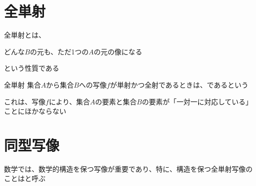 \documentclass[../../../topic_mapping]{subfiles}
\begin{document}
\sectionline
\section{全単射}

全単射とは、
\begin{shaded}
  どんな$B$の元も、ただ1つの$A$の元の像になる
\end{shaded}
という性質である

\begin{definition}{全単射}
  集合$A$から集合$B$への写像$f$が単射かつ全射であるときは、であるという
\end{definition}

これは、写像$f$により、集合$A$の要素と集合$B$の要素が「一対一に対応している」ことにほかならない

\sectionline
\section{同型写像}

数学では、数学的構造を保つ写像が重要であり、特に、構造を保つ全単射写像のことはと呼ぶ
\end{document}
